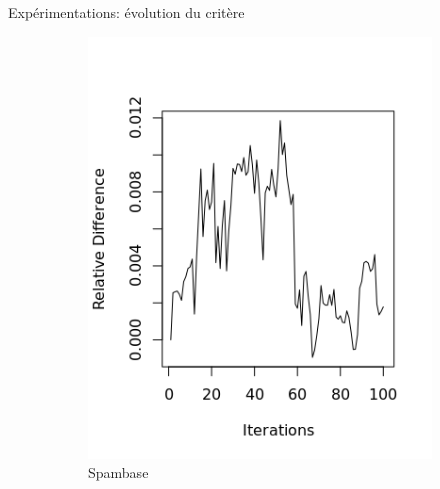 \documentclass[hyperref={pdfpagelabels=false}]{beamer}
\begin{document}
    \begin{frame}{Expérimentations: évolution du critère}
        \begin{figure}[!h]
            \centering
            \begin{subfigure}[b]{0.32\textwidth}
                \centering
                \includegraphics[width=1.0\textwidth]{spambase_RD3.png}
                \caption{Spambase}
            \end{subfigure}
            \begin{subfigure}[b]{0.32\textwidth}
                \centering

\end{subfigure}
\end{figure}
\end{frame}
\end{document}
